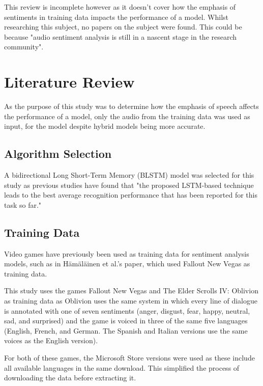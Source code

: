 \documentclass[journal]{IEEEtran}
\begin{document}
This review is incomplete however as it doesn't cover how the emphasis of sentiments in training data impacts the performance of a model.
Whilst researching this subject, no papers on the subject were found.
This could be because "audio sentiment analysis is still in a nascent stage
in the research community". \cite{maghilnan_sentiment_2017}

\section{Literature Review}

As the purpose of this study was to determine how the emphasis of speech affects
the performance of a model, only the audio from the training data was used as input,
for the model despite hybrid models being more accurate. \cite{bhaskar_hybrid_2015}

\subsection{Algorithm Selection}
A bidirectional Long Short-Term Memory (BLSTM) model was selected for this study as previous studies
have found that "the proposed LSTM-based technique leads to the best average recognition performance
that has been reported for this task so far." \cite{wollmer_lstm-modeling_2013}

\subsection{Training Data}
Video games have previously been used as training data for sentiment analysis models, such as in
Hämäläinen et al.'s paper, \cite{hamalainen_video_2022} which used Fallout New Vegas as training data.

This study uses the games Fallout New Vegas \cite{noauthor_buy_nodate} and
The Elder Scrolls IV: Oblivion \cite{noauthor_elder_nodate} as training data as
Oblivion uses the same system in which every line of dialogue is annotated with one of seven sentiments
(anger, disgust, fear, happy, neutral, sad, and surprised) and the game is voiced in three of the same five languages
(English, French, and German. The Spanish and Italian versions use the same voices as the English version).

For both of these games, the Microsoft Store versions were used as these include all available languages
in the same download. This simplified the process of downloading the data before extracting it.
\end{document}
